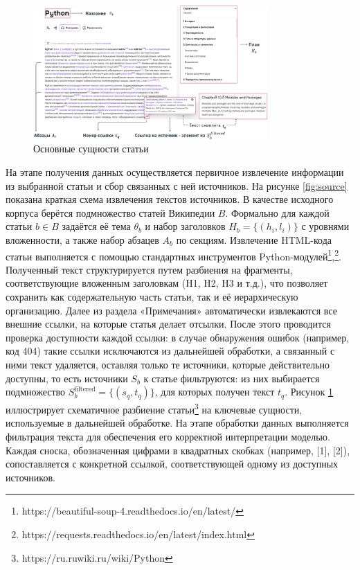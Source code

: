 \documentclass{article}
\theoremstyle{definition}
\theoremstyle{plain}
\begin{document}
\begin{figure}[ht!]
  \centering
  \includegraphics[width=0.8\textwidth]{figures/article_entities.png}
  \caption{Основные сущности статьи}
  \label{fig:article}
\end{figure}

На этапе получения данных осуществляется первичное извлечение информации из выбранной статьи и сбор связанных с ней источников. На рисунке \ref{fig:source} показана краткая схема извлечения текстов источников.
В качестве исходного корпуса берётся подмножество статей Википедии \(B\).
Формально для каждой статьи \(b\in B\) задаётся её тема \(\theta_b\) и набор заголовков \(H_b=\{(h_i,l_i)\}\) с уровнями вложенности, а также набор абзацев \(A_b\) по секциям.
Извлечение HTML-кода статьи выполняется с помощью стандартных инструментов Python-модулей\footnote{https://beautiful-soup-4.readthedocs.io/en/latest/},\footnote{https://requests.readthedocs.io/en/latest/index.html}. 
Полученный текст структурируется путем разбиения на фрагменты, соответствующие вложенным заголовкам (H1, H2, H3 и т.д.), что позволяет сохранить как содержательную часть статьи, так и её иерархическую организацию. 
Далее из раздела «Примечания» автоматически извлекаются все внешние ссылки, на которые статья делает отсылки. После этого проводится проверка доступности каждой ссылки: в случае обнаружения ошибок 
(например, код 404) такие ссылки исключаются из дальнейшей обработки, а связанный с ними текст удаляется, оставляя только те источники, которые действительно доступны,
то есть источники \(S_b\) к статье фильтруются: из них выбирается подмножество \(S_b^{\mathrm{filtered}}=\{(s_q,t_q)\}\), для которых получен текст \(t_q\). 
Рисунок \ref{fig:article} иллюстрирует схематичное разбиение статьи\footnote{https://ru.ruwiki.ru/wiki/Python} на ключевые сущности, используемые в дальнейшей обработке.
На этапе обработки данных выполняется фильтрация текста для обеспечения его корректной интерпретации моделью. 
Каждая сноска, обозначенная цифрами в квадратных скобках (например, [1], [2]), сопоставляется с конкретной ссылкой, соответствующей одному из доступных источников. 
\end{document}
